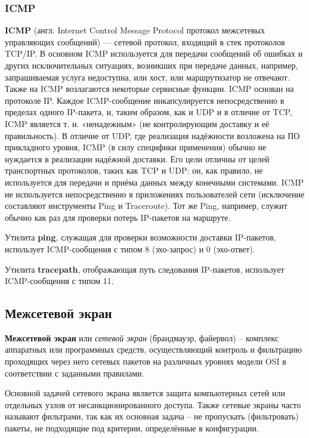 \documentclass[a4paper]{article}
\begin{document}
		\subsubsection{ICMP}
			\textbf{ICMP} (англ. Internet Control Message Protocol протокол межсетевых управляющих сообщений) — сетевой протокол, входящий в стек протоколов TCP/IP. В основном ICMP используется для передачи сообщений об ошибках и других исключительных ситуациях, возникших при передаче данных, например, запрашиваемая услуга недоступна, или хост, или маршрутизатор не отвечают. Также на ICMP возлагаются некоторые сервисные функции.
			ICMP основан на протоколе IP. Каждое ICMP-сообщение инкапсулируется непосредственно в пределах одного IP-пакета, и, таким образом, как и UDP и в отличие от TCP, ICMP является т. н. «ненадежным» (не контролирующим доставку и её правильность). В отличие от UDP, где реализация надёжности возложена на ПО прикладного уровня, ICMP (в силу специфики применения) обычно не нуждается в реализации надёжной доставки. Его цели отличны от целей транспортных протоколов, таких как TCP и UDP: он, как правило, не используется для передачи и приёма данных между конечными системами. ICMP не используется непосредственно в приложениях пользователей сети (исключение составляют инструменты Ping и Traceroute). Тот же Ping, например, служит обычно как раз для проверки потерь IP-пакетов на маршруте.

			Утилита \textbf{ping}, служащая для проверки возможности доставки IP-пакетов, использует ICMP-сообщения с типом 8 (эхо-запрос) и 0 (эхо-ответ).

			Утилита \textbf{tracepath}, отображающая путь следования IP-пакетов, использует ICMP-сообщения с типом 11.

	\subsection{Межсетевой экран}
	
		\textbf{Межсетевой экран} или \emph{сетевой экран} (брандмауэр, файервол) -- комплекс аппаратных или программных средств, осуществляющий контроль и фильтрацию проходящих через него сетевых пакетов на различных уровнях модели OSI в соответствии с заданными правилами.
	
		Основной задачей сетевого экрана является защита компьютерных сетей или отдельных узлов от несанкционированного доступа. Также сетевые экраны часто называют фильтрами, так как их основная задача -- не пропускать (фильтровать) пакеты, не подходящие под критерии, определённые в конфигурации.
	
\end{document}
